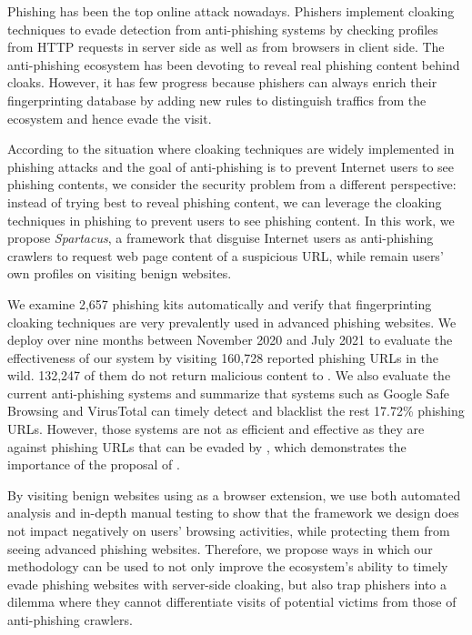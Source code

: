 Phishing has been the top online attack nowadays.
Phishers implement cloaking techniques to evade detection from anti-phishing systems by checking profiles from HTTP requests in server side as well as from browsers in client side.
The anti-phishing ecosystem has been devoting to reveal real phishing content behind cloaks.
However, it has few progress because phishers can always enrich their fingerprinting database by adding new rules to distinguish traffics from the ecosystem and hence evade the visit.

According to the situation where cloaking techniques are widely implemented in phishing attacks and the goal of anti-phishing is to prevent Internet users to see phishing contents, we consider the security problem from a different perspective: instead of trying best to reveal phishing content, we can leverage the cloaking techniques in phishing to prevent users to see phishing content. In this work, we propose \emph{Spartacus}, a framework that disguise Internet users as anti-phishing crawlers to request web page content of a suspicious URL, while remain users' own profiles on visiting benign websites.


We examine 2,657 phishing kits automatically and verify that fingerprinting cloaking techniques are very prevalently used in advanced phishing websites.
We deploy \spartacus over nine months between November 2020 and July 2021 to evaluate the effectiveness of our system by visiting 160,728 reported phishing URLs in the wild.
132,247 of them do not return malicious content to \spartacus.
We also evaluate the current anti-phishing systems and summarize that systems such as Google Safe Browsing and VirusTotal can timely detect and blacklist the rest 17.72\% phishing URLs.
However, those systems are not as efficient and effective as they are against phishing URLs that can be evaded by \spartacus,
which demonstrates the importance of the proposal of \spartacus.

By visiting benign websites using \spartacus as a browser extension, we use both automated analysis and in-depth manual testing to show that the framework we design does not impact negatively on users' browsing activities, while protecting them from seeing advanced phishing websites.
Therefore, we propose ways in which our methodology can be used to not only improve the ecosystem’s ability to timely evade phishing websites with server-side cloaking, but also trap phishers into a dilemma where they cannot differentiate visits of potential victims from those of anti-phishing crawlers.
